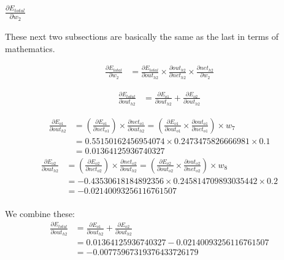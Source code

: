 \documentclass{article}
\begin{document}
\subsubsection{$\frac{\partial E_{total}}{\partial w_2}$}
These next two subsections are basically the same as the last in terms of 
mathematics.

\begin{align*} \frac{\partial E_{total}}{\partial w_2} & =
    \frac{\partial E_{total}}{\partial out_{h2}} \times
    \frac{\partial out_{h2}}{\partial net_{h2}} \times
    \frac{\partial net_{h2}}{\partial w_2}
\end{align*}

\begin{align*}
    \frac{\partial E_{total}}{\partial out_{h2}} & = 
    \frac{\partial E_{o1}}{\partial out_{h2}} +
    \frac{\partial E_{o2}}{\partial out_{h2}}
\end{align*}

\begin{align*}
    \frac{\partial E_{o1}}{\partial out_{h2}} & =
    (\frac{\partial E_{o1}}{\partial net_{o1}}) \times
    \frac{\partial net_{o1}}{\partial out_{h2}}
    = (\frac{\partial E_{o1}}{\partial out_{o1}} \times
        \frac{\partial out_{o1}}{\partial net_{o1}} ) \times w_7 \\
    & = 0.55150162456954074 \times 0.2473475826666981 \times 0.1 \\
    & = 0.01364125936740327
\end{align*}
\begin{align*}
    \frac{\partial E_{o2}}{\partial out_{h2}} & =
    (\frac{\partial E_{o2}}{\partial net_{o2}}) \times
    \frac{\partial net_{o2}}{\partial out_{h2}} 
    = (\frac{\partial E_{o2}}{\partial out_{o2}} \times
        \frac{\partial out_{o2}}{\partial net_{o2}} ) \times w_8 \\
    &= -0.43530618184892356 \times 0.245814709893035442 \times 0.2 \\
    & = -0.02140093256116761507 \\
\end{align*}

We combine these:
\begin{align*}
    \frac{\partial E_{total}}{\partial out_{h2}} & = 
    \frac{\partial E_{o1}}{\partial out_{h2}} +
    \frac{\partial E_{o2}}{\partial out_{h2}} \\
    & = 0.01364125936740327 - 0.02140093256116761507 \\
    &= -0.00775967319376433726179
\end{align*}
\end{document}
